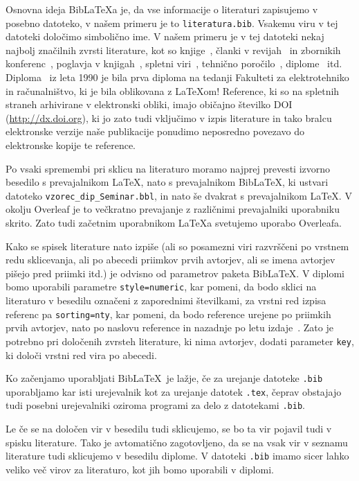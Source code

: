 \documentclass[a4paper,12pt,openright]{book}
\newcommand{\BibLaTeX}{{\sc Bib}\LaTeX}
\begin{document}
Osnovna ideja \BibLaTeX{a} je, da vse informacije o literaturi zapisujemo v posebno datoteko, v našem primeru je to \texttt{literatura.bib}.
Vsakemu viru v tej datoteki določimo simbolično ime.
V  našem primeru je v tej datoteki nekaj najbolj značilnih zvrsti literature, kot so knjige~\cite{lamport}, 
članki v revijah~\cite{leonardo} in zbornikih konferenc~\cite{ciuha2010visualization},
poglavja v knjigah~\cite{poglavje_springer}, 
spletni viri~\cite{slovarji,video}, 
tehnično poročilo~\cite{andersen2012kinect}, 
diplome~\cite{diploma} itd.
Diploma~\cite{diploma} iz leta 1990 je bila prva diploma na tedanji Fakulteti za elektrotehniko in računalništvo, ki je bila oblikovana z \LaTeX om!
Reference, ki so na spletnih straneh arhivirane v elektronski obliki, imajo običajno  \v stevilko DOI (\url{http://dx.doi.org}), ki jo zato tudi vključimo v izpis literature in tako bralcu elektronske verzije naše publikacije ponudimo neposredno povezavo do elektronske kopije te reference.

Po vsaki spremembi pri sklicu na literaturo moramo najprej prevesti izvorno besedilo s prevajalnikom \LaTeX, nato s prevajalnikom  \BibLaTeX, ki ustvari datoteko  {\tt vzorec\_dip\_Seminar.bbl}, in nato še dvakrat s prevajalnikom  \LaTeX.
V okolju Overleaf je to večkratno prevajanje z različnimi prevajalniki uporabniku skrito. Zato tudi začetnim uporabnikom \LaTeX a svetujemo uporabo Overleafa.

Kako se spisek literature nato izpiše (ali so posamezni viri razvrščeni po vrstnem redu sklicevanja, ali po abecedi priimkov prvih avtorjev, ali se imena avtorjev pišejo pred priimki itd.) je odvisno od parametrov paketa \BibLaTeX.
V diplomi bomo uporabili parametre 
\texttt{style=numeric}, kar pomeni, da bodo sklici na literaturo v besedilu označeni z zaporednimi številkami, za vrstni red izpisa referenc pa 
\texttt{sorting=nty}, kar pomeni, da bodo reference urejene po priimkih prvih avtorjev, nato po naslovu reference in nazadnje po letu izdaje~\cite{ctan}.
Zato je potrebno pri določenih zvrsteh literature, ki nima avtorjev, dodati parameter \texttt{key}, ki določi vrstni red vira po abecedi.

Ko začenjamo uporabljati \BibLaTeX\ je lažje, če za urejanje datoteke \texttt{.bib} uporabljamo kar isti urejevalnik kot za urejanje datotek \texttt{.tex}, 
čeprav obstajajo tudi posebni urejevalniki oziroma programi za delo z datotekami \texttt{.bib}.

Le če se  na določen vir v besedilu tudi sklicujemo, se bo ta vir pojavil tudi v spisku literature.
Tako je avtomatično zagotovljeno, da se na vsak vir v seznamu literature tudi sklicujemo v besedilu diplome.
V datoteki \texttt{.bib} imamo sicer lahko veliko več virov za literaturo, kot jih bomo uporabili v diplomi.
\end{document}
